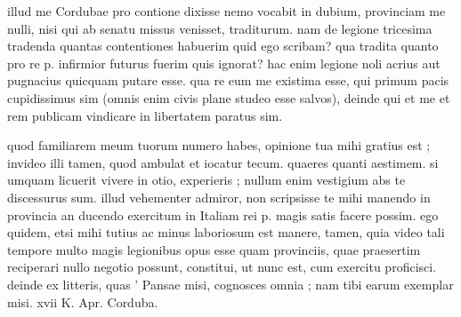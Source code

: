  illud me Cordubae pro contione dixisse nemo vocabit in dubium, provinciam me nulli, nisi qui ab senatu missus venisset, traditurum. nam de legione tricesima tradenda quantas contentiones habuerim quid ego scribam? qua tradita quanto pro re p. infirmior futurus fuerim quis ignorat? hac enim legione noli acrius aut pugnacius quicquam putare esse. qua re eum me existima esse, qui primum pacis cupidissimus sim (omnis enim civis plane studeo esse salvos), deinde qui et me et rem publicam vindicare in libertatem paratus sim.

 quod familiarem meum tuorum numero habes, opinione tua mihi gratius est ; invideo illi tamen, quod ambulat et iocatur tecum. quaeres quanti aestimem. si umquam licuerit vivere in otio, experieris ; nullum enim vestigium abs te discessurus sum. illud vehementer admiror, non scripsisse te mihi manendo in provincia an ducendo exercitum in Italiam rei p. magis satis facere possim. ego quidem, etsi mihi tutius ac minus laboriosum est manere, tamen, quia video tali tempore multo magis legionibus opus esse quam provinciis, quae praesertim reciperari nullo negotio possunt, constitui, ut nunc est, cum exercitu proficisci. deinde ex litteris, quas ' Pansae misi, cognosces omnia ; nam tibi earum exemplar misi. xvii K. Apr. Corduba.
